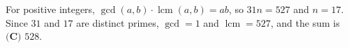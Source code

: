 For positive integers, $\gcd(a,b)\cdot\operatorname{lcm}(a,b)=ab$, so $31n=527$ and $n=17$. Since $31$ and $17$ are distinct primes, $\gcd=1$ and $\operatorname{lcm}=527$, and the sum is $\boxed{\textbf{(C) }528}$.
